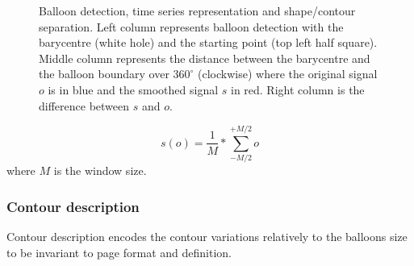 	\begin{figure}	%
	  \centering
		\caption[Balloon contour time series]{Balloon detection, time series representation and shape/contour separation. Left column represents balloon detection with the barycentre (white hole) and the starting point (top left half square). Middle column represents the distance between the barycentre and the balloon boundary over $360^\circ$ (clockwise) where the original signal $o$ is in blue and the smoothed signal $s$ in red. Right column is the difference between $s$ and $o$.}
		\label{fig:be:time_series}
	\end{figure}

\begin{equation}
\label{eq:be:smooth}
 s(o) = \frac{1}{M} * \sum_{-M/2}^{+M/2} o
\end{equation}
where $M$ is the window size.%



\subsubsection{Contour description}
\label{sec:be:description}

Contour description encodes the contour variations relatively to the balloons size to be invariant to page format and definition.

